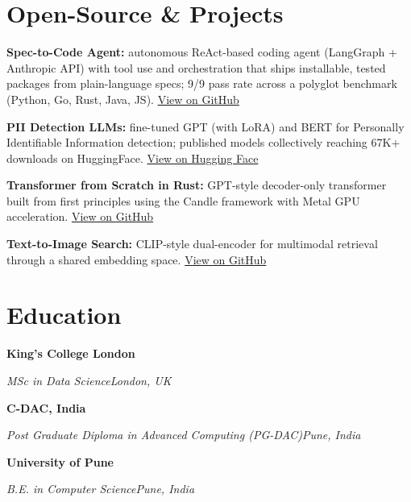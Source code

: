\documentclass[10pt,a4paper]{article}
\newcommand{\entry}[4]{%
  {\color{company}\bfseries #1}\hfill {\color{muted}#2}\par
  \vspace{1pt}
  {\itshape #3}\hfill {\color{muted}\itshape #4}\par
  \vspace{3pt}%
}
\begin{document}
\section{Open-Source \& Projects}
\begin{tight}
  \item \textbf{Spec-to-Code Agent:} autonomous ReAct-based coding agent (LangGraph + Anthropic API) with tool use and orchestration that ships installable, tested packages from plain-language specs; 9/9 pass rate across a polyglot benchmark (Python, Go, Rust, Java, JS). \href{https://github.com/abhijeetscode/Spec-to-Code-Agent}{View on GitHub}
  \item \textbf{PII Detection LLMs:} fine-tuned GPT (with LoRA) and BERT for Personally Identifiable Information detection; published models collectively reaching 67K+ downloads on HuggingFace. \href{https://huggingface.co/ab-ai/pii_model}{View on Hugging Face}
  \item \textbf{Transformer from Scratch in Rust:} GPT-style decoder-only transformer built from first principles using the Candle framework with Metal GPU acceleration. \href{https://github.com/abhijeetscode/transformer-rust}{View on GitHub}
  \item \textbf{Text-to-Image Search:} CLIP-style dual-encoder for multimodal retrieval through a shared embedding space. \href{https://github.com/abhijeetscode/text-to-image-search}{View on GitHub}
\end{tight}

\section{Education}
\entry{King's College London}{}{MSc in Data Science}{London, UK}
\vspace{-3pt}
\entry{C-DAC, India}{}{Post Graduate Diploma in Advanced Computing (PG-DAC)}{Pune, India}
\vspace{-3pt}
\entry{University of Pune}{}{B.E. in Computer Science}{Pune, India}
\end{document}
